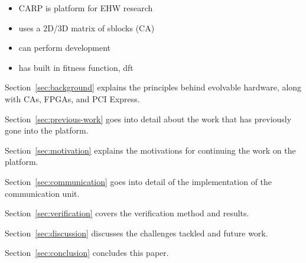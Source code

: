 \TODO

\begin{itemize}
    \item CARP is platform for EHW research
    \item uses a 2D/3D matrix of sblocks (CA)
    \item can perform development
    \item has built in fitness function, dft
\end{itemize}


Section~\ref{sec:background} explains the principles behind evolvable hardware, along with CAs, FPGAs, and PCI Express.

Section~\ref{sec:previous-work} goes into detail about the work that has previously gone into the platform.

Section~\ref{sec:motivation} explains the motivations for continuing the work on the platform.

Section~\ref{sec:communication} goes into detail of the implementation of the communication unit.

Section~\ref{sec:verification} covers the verification method and results.

Section~\ref{sec:discussion} discusses the challenges tackled and future work.

Section~\ref{sec:conclusion} concludes this paper.

